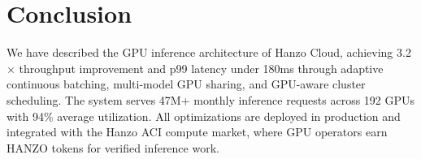 \section{Conclusion}

\label{sec:conclusion}

We have described the GPU inference architecture of Hanzo Cloud, achieving
3.2$\times$ throughput improvement and p99 latency under 180ms through adaptive
continuous batching, multi-model GPU sharing, and GPU-aware cluster scheduling.
The system serves 47M+ monthly inference requests across 192 GPUs with 94\%
average utilization. All optimizations are deployed in production and integrated
with the Hanzo ACI compute market, where GPU operators earn HANZO tokens for
verified inference work.

